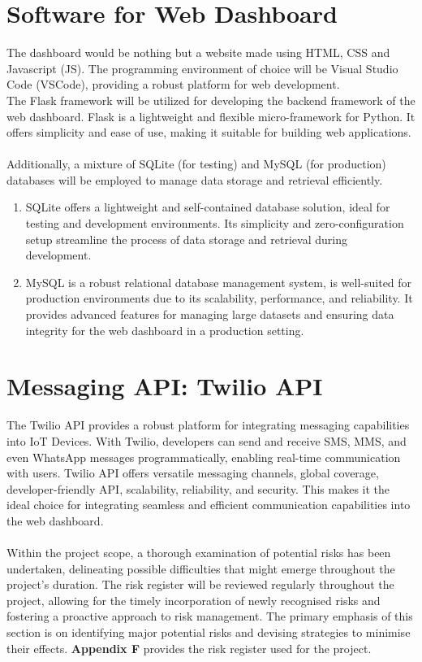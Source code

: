 \section{Software for Web Dashboard}
The dashboard would be nothing but a website made using HTML, CSS and Javascript (JS). The programming environment of choice will be Visual Studio Code (VSCode), providing a robust platform for web development. \\

\noindent The Flask framework will be utilized for developing the backend framework of the web dashboard. Flask is a lightweight and flexible micro-framework for Python. It offers simplicity and ease of use, making it suitable for building web applications. \\ \\
Additionally, a mixture of SQLite (for testing) and MySQL (for production) databases will be employed to manage data storage and retrieval efficiently. 
\begin{enumerate}
    \item SQLite offers a lightweight and self-contained database solution, ideal for testing and development environments. Its simplicity and zero-configuration setup streamline the process of data storage and retrieval during development.
    \item MySQL is a robust relational database management system, is well-suited for production environments due to its scalability, performance, and reliability. It provides advanced features for managing large datasets and ensuring data integrity for the web dashboard in a production setting.
\end{enumerate}

\section{Messaging API: Twilio API}
The Twilio API provides a robust platform for integrating messaging capabilities into IoT Devices. With Twilio, developers can send and receive SMS, MMS, and even WhatsApp messages programmatically, enabling real-time communication with users. Twilio API offers versatile messaging channels, global coverage, developer-friendly API, scalability, reliability, and security. This makes it the ideal choice for integrating seamless and efficient communication capabilities into the web dashboard.\\ \\

\noindent Within the project scope, a thorough examination of potential risks has been undertaken, delineating possible difficulties that might emerge throughout the project’s duration. The risk register will be reviewed regularly throughout the project, allowing for the timely incorporation of newly recognised risks and fostering a proactive approach to risk management.  The primary emphasis of this section is on identifying major potential risks and devising strategies to minimise their effects. \textbf{Appendix F} provides the risk register used for the project.

